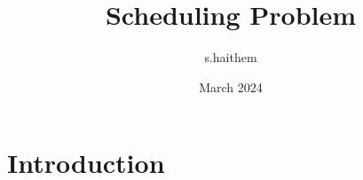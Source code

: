 \documentclass{article}
\title{Scheduling Problem}
\author{s.haithem }
\date{March 2024}
\begin{document}
\maketitle

\section{Introduction}
\end{document}
